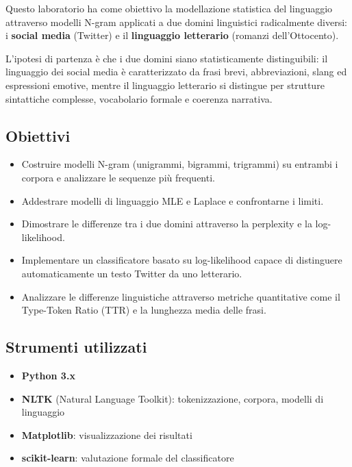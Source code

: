 \documentclass[12pt, a4paper]{article}
\begin{document}
Questo laboratorio ha come obiettivo la modellazione statistica del linguaggio
attraverso modelli N-gram applicati a due domini linguistici radicalmente diversi:
i \textbf{social media} (Twitter) e il \textbf{linguaggio letterario} (romanzi
dell'Ottocento).

L'ipotesi di partenza è che i due domini siano statisticamente distinguibili:
il linguaggio dei social media è caratterizzato da frasi brevi, abbreviazioni,
slang ed espressioni emotive, mentre il linguaggio letterario si distingue per
strutture sintattiche complesse, vocabolario formale e coerenza narrativa.

\subsection{Obiettivi}

\begin{itemize}
    \item Costruire modelli N-gram (unigrammi, bigrammi, trigrammi) su entrambi
          i corpora e analizzare le sequenze più frequenti.
    \item Addestrare modelli di linguaggio MLE e Laplace e confrontarne i limiti.
    \item Dimostrare le differenze tra i due domini attraverso la perplexity
          e la log-likelihood.
    \item Implementare un classificatore basato su log-likelihood capace di
          distinguere automaticamente un testo Twitter da uno letterario.
    \item Analizzare le differenze linguistiche attraverso metriche quantitative
          come il Type-Token Ratio (TTR) e la lunghezza media delle frasi.
\end{itemize}

\subsection{Strumenti utilizzati}

\begin{itemize}
    \item \textbf{Python 3.x}
    \item \textbf{NLTK} (Natural Language Toolkit): tokenizzazione, corpora,
          modelli di linguaggio
    \item \textbf{Matplotlib}: visualizzazione dei risultati
    \item \textbf{scikit-learn}: valutazione formale del classificatore
\end{itemize}
\end{document}
